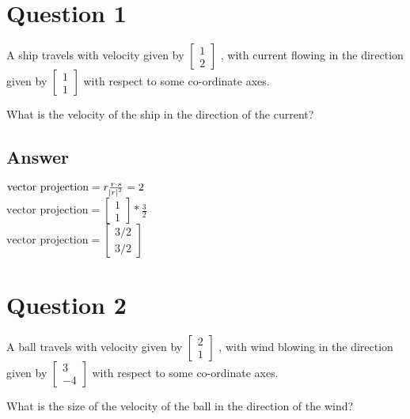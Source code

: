 \documentclass[12pt]{article}
\begin{document}
    \section*{Question 1}
    \begin{flushleft}
        A ship travels with velocity given by
        $
            \begin{bmatrix}
                1 \\ 2
            \end{bmatrix}
        $
        , with current flowing in the direction given by 
        $
            \begin{bmatrix}
                1 \\ 1 
            \end{bmatrix}
        $
        with respect to some co-ordinate axes.
        \begin{flushleft}
            What is the velocity of the ship in the direction of the current?
        \end{flushleft}
    \end{flushleft}
    \subsection*{Answer}
    \begin{flushleft}
        $
            \text{vector projection} = r \frac{r \cdot s}{\abs{r}^2}
            = 2
        $ \\
        $
            \text{vector projection} = 
            \begin{bmatrix}
                1 \\ 1
            \end{bmatrix}
            *
            \frac{3}{2}
        $ \\
        $
            \boxed{
                \text{vector projection} =
                \begin{bmatrix}
                    3/2 \\ 3/2
                \end{bmatrix}
            }
        $
    \end{flushleft}

    \section*{Question 2}
    \begin{flushleft}
        A ball travels with velocity given by
        $
            \begin{bmatrix}
                2 \\ 1
            \end{bmatrix}
        $
        , with wind blowing in the direction given by
        $
            \begin{bmatrix}
                3 \\ -4
            \end{bmatrix}
        $
        with respect to some co-ordinate axes.
    \end{flushleft}
    \begin{flushleft}
        What is the size of the velocity of the ball in the direction of the wind?
    \end{flushleft}
\end{document}
